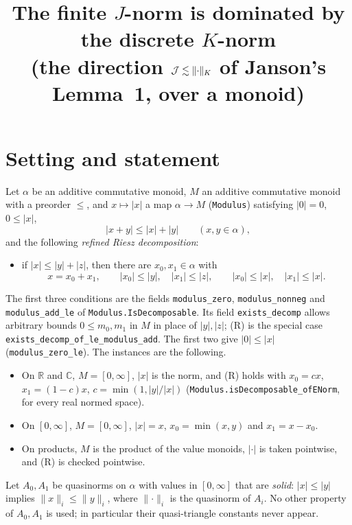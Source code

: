 \documentclass[11pt]{article}
\title{The finite \(J\)-norm is dominated by the discrete \(K\)-norm\\
\large (the direction \(\cJ \lesssim \norm{\cdot}{K}\) of Janson's Lemma~1, over a monoid)}
\date{}
\theoremstyle{definition}
\theoremstyle{remark}
\newcommand{\abs}[1]{\lvert #1\rvert}
\newcommand{\norm}[2]{\lVert #1\rVert_{#2}}
\begin{document}
\maketitle

\section{Setting and statement}

Let \(\alpha\) be an additive commutative monoid, \(M\) an additive commutative monoid with a
preorder \(\le\), and \(x \mapsto \abs{x}\) a map \(\alpha \to M\) (\texttt{Modulus}) satisfying
\(\abs{0} = 0\), \(0 \le \abs{x}\),
\begin{equation}\label{eq:abs-add}
  \abs{x+y} \le \abs{x} + \abs{y} \qquad (x, y \in \alpha),
\end{equation}
and the following \emph{refined Riesz decomposition}:
\begin{itemize}
  \item[(R)] if \(\abs{x} \le \abs{y} + \abs{z}\), then there are \(x_0, x_1 \in \alpha\) with
  \[
    x = x_0 + x_1,\qquad \abs{x_0} \le \abs{y},\quad \abs{x_1} \le \abs{z},\qquad
    \abs{x_0} \le \abs{x},\quad \abs{x_1} \le \abs{x}.
  \]
\end{itemize}
The first three conditions are the fields \texttt{modulus\_zero}, \texttt{modulus\_nonneg} and
\texttt{modulus\_add\_le} of \texttt{Modulus.IsDecomposable}. Its field \texttt{exists\_decomp}
allows arbitrary bounds \(0 \le m_0, m_1\) in \(M\) in place of \(\abs{y}, \abs{z}\); (R) is
the special case \texttt{exists\_decomp\_of\_le\_modulus\_add}. The
first two give \(\abs{0} \le \abs{x}\) (\texttt{modulus\_zero\_le}). The instances are the
following.
\begin{itemize}
  \item On \(\mathbb R\) and \(\mathbb C\), \(M = [0,\infty]\), \(\abs{x}\) is the norm, and
    (R) holds with
    \(x_0 = cx\), \(x_1 = (1-c)x\), \(c = \min(1, \abs{y}/\abs{x})\)
    (\texttt{Modulus.isDecomposable\_ofENorm}, for every real normed space).
  \item On \([0,\infty]\), \(M = [0,\infty]\), \(\abs{x} = x\), \(x_0 = \min(x, y)\) and
    \(x_1 = x - x_0\).
  \item On products, \(M\) is the product of the value monoids, \(\abs{\cdot}\) is taken
    pointwise, and (R) is checked pointwise.
\end{itemize}

Let \(A_0, A_1\) be quasinorms on \(\alpha\) with values in \([0,\infty]\) that are
\emph{solid}: \(\abs{x} \le \abs{y}\) implies \(\norm{x}{i} \le \norm{y}{i}\), where
\(\norm{\cdot}{i}\) is the quasinorm of \(A_i\). No other property of \(A_0, A_1\) is used; in
particular their quasi-triangle constants never appear.
\end{document}
